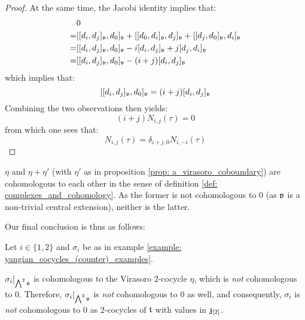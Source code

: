 \begin{proof}
                At the same time, the Jacobi identity implies that:
                    $$
                        \begin{aligned}
                            & 0
                            \\
                            = & [[d_i, d_j]_{\mathfrak{v}}, d_0]_{\mathfrak{v}} + [[d_0, d_i]_{\mathfrak{v}}, d_j]_{\mathfrak{v}} + [[d_j, d_0]_{\mathfrak{v}}, d_i]_{\mathfrak{v}}
                            \\
                            = & [[d_i, d_j]_{\mathfrak{v}}, d_0]_{\mathfrak{v}} - i [d_i, d_j]_{\mathfrak{v}} + j [d_j, d_i]_{\mathfrak{v}}
                            \\
                            = & [[d_i, d_j]_{\mathfrak{v}}, d_0]_{\mathfrak{v}} - (i + j) [d_i, d_j]_{\mathfrak{v}}
                        \end{aligned}
                    $$
                which implies that:
                    $$[[d_i, d_j]_{\mathfrak{v}}, d_0]_{\mathfrak{v}} = (i + j) [d_i, d_j]_{\mathfrak{v}}$$
                Combining the two observations then yields:
                    $$(i + j) N_{i, j}(\tau) = 0$$
                from which one sees that:
                    $$N_{i, j}(\tau) = \delta_{i + j, 0} N_{i, -i}(\tau)$$
            \end{proof}
        \begin{corollary}
            $\eta$ and $\eta + \eta'$ (with $\eta'$ as in proposition \ref{prop: a_virasoro_coboundary}) are cohomologous to each other in the sense of definition \ref{def: complexes_and_cohomology}. As the former is not cohomologous to $0$ (as $\mathfrak{v}$ is a non-trivial central extension), neither is the latter.
        \end{corollary}
        Our final conclusion is thus as follows:
        \begin{theorem} \label{theorem: non_trivial_yangian_cocycles_examples}
            Let $i \in \{1, 2\}$ and $\sigma_i$ be as in example \ref{example: yangian_cocycles_(counter)_examples}.
        
            $\sigma_i|_{ \bigwedge^2 \mathfrak{v} }$ is cohomologous to the Virasoro $2$-cocycle $\eta$, which is \textit{not} cohomologous to $0$. Therefore, $\sigma_i|_{ \bigwedge^2 \mathfrak{v} }$ is \textit{not} cohomologous to $0$ as well, and consequently, $\sigma_i$ is \textit{not} cohomologous to $0$ as $2$-cocycles of $\mathfrak{t}$ with values in $\mathfrak{z}_{[2]}$.
        \end{theorem}
